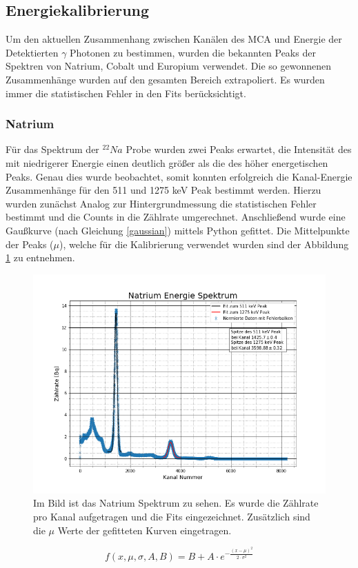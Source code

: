 \subsection{Energiekalibrierung}
Um den aktuellen Zusammenhang zwischen Kanälen des MCA und Energie der Detektierten $\gamma$ Photonen zu bestimmen, wurden die bekannten Peaks der Spektren von Natrium, Cobalt und Europium verwendet. Die so gewonnenen Zusammenhänge wurden auf den gesamten Bereich extrapoliert. Es wurden immer die statistischen Fehler in den Fits berücksichtigt. 
\subsubsection{Natrium}
Für das Spektrum der $^{22}Na$ Probe wurden zwei Peaks erwartet, die Intensität des mit niedrigerer Energie einen deutlich größer als die des höher energetischen Peaks. Genau dies wurde beobachtet, somit konnten erfolgreich die Kanal-Energie Zusammenhänge für den 511 und 1275 keV Peak bestimmt werden. Hierzu wurden zunächst Analog zur Hintergrundmessung die statistischen Fehler bestimmt und die Counts in die Zählrate umgerechnet. 
Anschließend wurde eine Gaußkurve (nach Gleichung \ref{gaussian}) mittels Python \cite{SciPy_Opti} gefittet. Die Mittelpunkte der Peaks ($\mu$), welche für die Kalibrierung verwendet wurden sind der Abbildung \ref{natrium} zu entnehmen. 
\begin{figure}[h]
	\centering
	\includegraphics[scale=0.5]{Bilder/Natrium}
	\caption[Natriumspektrum mit Peaks]{\small Im Bild ist das Natrium Spektrum zu sehen. Es wurde die Zählrate pro Kanal aufgetragen und die Fits eingezeichnet. Zusätzlich sind die $\mu$ Werte der gefitteten Kurven eingetragen.}
	\label{natrium}
\end{figure}
\begin{equation}
f(x,\mu, \sigma, A, B) = B + A \cdot e ^{-\frac{(x - \mu) ^ 2}{2 \cdot \sigma ^ 2}}
\label{gaussian}
\end{equation}
